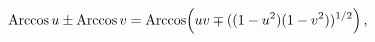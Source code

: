 \[\mathop{\mathrm{Arccos}\/}\nolimits u\pm\mathop{\mathrm{Arccos}\/}\nolimits v=%
\mathop{\mathrm{Arccos}\/}\nolimits\!\left(uv\mp((1-u^{2})(1-v^{2}))^{1/2}%
\right),\]